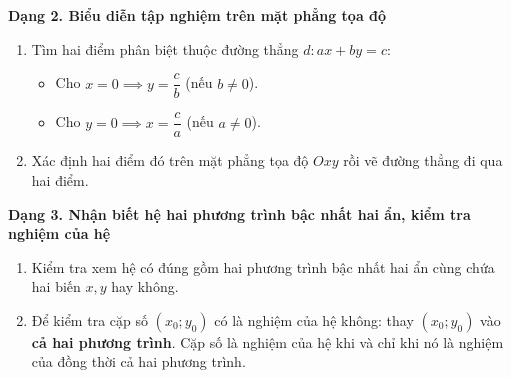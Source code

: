 \textbf{Dạng 2. Biểu diễn tập nghiệm trên mặt phẳng tọa độ}
\begin{enumerate}
\item Tìm hai điểm phân biệt thuộc đường thẳng $d\colon ax + by = c$:
\begin{itemize}
\item Cho $x = 0 \implies y = \dfrac{c}{b}$ (nếu $b \ne 0$).
\item Cho $y = 0 \implies x = \dfrac{c}{a}$ (nếu $a \ne 0$).
\end{itemize}
\item Xác định hai điểm đó trên mặt phẳng tọa độ $Oxy$ rồi vẽ đường thẳng đi qua hai điểm.
\end{enumerate}

\textbf{Dạng 3. Nhận biết hệ hai phương trình bậc nhất hai ẩn, kiểm tra nghiệm của hệ}
\begin{enumerate}
\item Kiểm tra xem hệ có đúng gồm hai phương trình bậc nhất hai ẩn cùng chứa hai biến $x, y$ hay không.
\item Để kiểm tra cặp số $(x_0; y_0)$ có là nghiệm của hệ không: thay $(x_0; y_0)$ vào \textbf{cả hai phương trình}. Cặp số là nghiệm của hệ khi và chỉ khi nó là nghiệm của đồng thời cả hai phương trình.
\end{enumerate}
